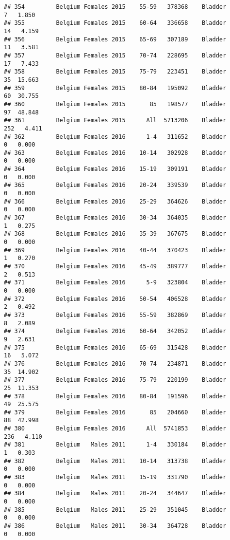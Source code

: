 \documentclass[
]{article}
\begin{document}
\begin{verbatim}
## 354         Belgium Females 2015    55-59   378368    Bladder      7   1.850
## 355         Belgium Females 2015    60-64   336658    Bladder     14   4.159
## 356         Belgium Females 2015    65-69   307189    Bladder     11   3.581
## 357         Belgium Females 2015    70-74   228695    Bladder     17   7.433
## 358         Belgium Females 2015    75-79   223451    Bladder     35  15.663
## 359         Belgium Females 2015    80-84   195092    Bladder     60  30.755
## 360         Belgium Females 2015       85   198577    Bladder     97  48.848
## 361         Belgium Females 2015      All  5713206    Bladder    252   4.411
## 362         Belgium Females 2016      1-4   311652    Bladder      0   0.000
## 363         Belgium Females 2016    10-14   302928    Bladder      0   0.000
## 364         Belgium Females 2016    15-19   309191    Bladder      0   0.000
## 365         Belgium Females 2016    20-24   339539    Bladder      0   0.000
## 366         Belgium Females 2016    25-29   364626    Bladder      0   0.000
## 367         Belgium Females 2016    30-34   364035    Bladder      1   0.275
## 368         Belgium Females 2016    35-39   367675    Bladder      0   0.000
## 369         Belgium Females 2016    40-44   370423    Bladder      1   0.270
## 370         Belgium Females 2016    45-49   389777    Bladder      2   0.513
## 371         Belgium Females 2016      5-9   323804    Bladder      0   0.000
## 372         Belgium Females 2016    50-54   406528    Bladder      2   0.492
## 373         Belgium Females 2016    55-59   382869    Bladder      8   2.089
## 374         Belgium Females 2016    60-64   342052    Bladder      9   2.631
## 375         Belgium Females 2016    65-69   315428    Bladder     16   5.072
## 376         Belgium Females 2016    70-74   234871    Bladder     35  14.902
## 377         Belgium Females 2016    75-79   220199    Bladder     25  11.353
## 378         Belgium Females 2016    80-84   191596    Bladder     49  25.575
## 379         Belgium Females 2016       85   204660    Bladder     88  42.998
## 380         Belgium Females 2016      All  5741853    Bladder    236   4.110
## 381         Belgium   Males 2011      1-4   330184    Bladder      1   0.303
## 382         Belgium   Males 2011    10-14   313738    Bladder      0   0.000
## 383         Belgium   Males 2011    15-19   331790    Bladder      0   0.000
## 384         Belgium   Males 2011    20-24   344647    Bladder      0   0.000
## 385         Belgium   Males 2011    25-29   351045    Bladder      0   0.000
## 386         Belgium   Males 2011    30-34   364728    Bladder      0   0.000

\end{verbatim}
\end{document}
